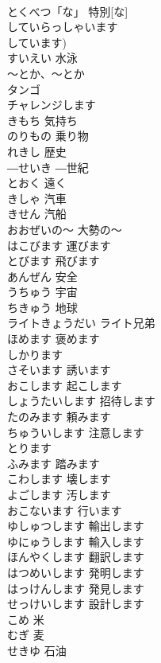\documentclass[8pt]{extreport}
\begin{document}
\begin{CJK}{UTF8}{min}
\\	とくべつ「な」	特別[な]	
\\	していらっしゃいます			
\\	しています)		
\\	すいえい	水泳	
\\	～とか、～とか			
\\	タンゴ			
\\	チャレンジします			
\\	きもち	気持ち	
\\	のりもの	乗り物	
\\	れきし	歴史	
\\	―せいき	―世紀	
\\	とおく	遠く	
\\	きしゃ	汽車	
\\	きせん	汽船	
\\	おおぜいの～	大勢の～	
\\	はこびます	運びます	
\\	とびます	飛びます	
\\	あんぜん	安全	
\\	うちゅう	宇宙	
\\	ちきゅう	地球	
\\	ライトきょうだい	ライト兄弟	
\\	ほめます	褒めます	
\\	しかります			
\\	さそいます	誘います	
\\	おこします	起こします	
\\	しょうたいします	招待します	
\\	たのみます	頼みます	
\\	ちゅういします	注意します	
\\	とります			
\\	ふみます	踏みます	
\\	こわします	壊します	
\\	よごします	汚します	
\\	おこないます	行います	
\\	ゆしゅつします	輸出します	
\\	ゆにゅうします	輸入します	
\\	ほんやくします	翻訳します	
\\	はつめいします	発明します	
\\	はっけんします	発見します	
\\	せっけいします	設計します	
\\	こめ	米	
\\	むぎ	麦	
\\	せきゆ	石油	

\end{CJK}
\end{document}
